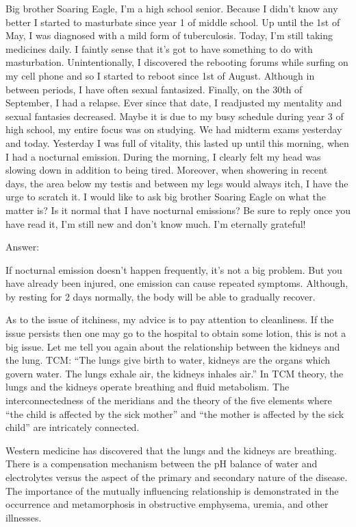 \documentclass[
]{book}
\begin{document}
Big brother Soaring Eagle, I'm a high school senior. Because I didn't know any better I started to masturbate since year 1 of middle school. Up until the 1st of May, I was diagnosed with a mild form of tuberculosis. Today, I'm still taking medicines daily. I faintly sense that it's got to have something to do with masturbation. Unintentionally, I discovered the rebooting forums while surfing on my cell phone and so I started to reboot since 1st of August. Although in between periods, I have often sexual fantasized. Finally, on the 30th of September, I had a relapse.
Ever since that date, I readjusted my mentality and sexual fantasies decreased. Maybe it is due to my busy schedule during year 3 of high school, my entire focus was on studying. We had midterm exams yesterday and today. Yesterday I was full of vitality, this lasted up until this morning, when I had a nocturnal emission. During the morning, I clearly felt my head was slowing down in addition to being tired. Moreover, when showering in recent days, the area below my testis and between my legs would always itch, I have the urge to scratch it. I would like to ask big brother Soaring Eagle on what the matter is? Is it normal that I have nocturnal emissions? Be sure to reply once you have read it, I'm still new and don't know much. I'm eternally grateful!

Answer:

If nocturnal emission doesn't happen frequently, it's not a big problem. But you have already been injured, one emission can cause repeated symptoms. Although, by resting for 2 days normally, the body will be able to gradually recover.

As to the issue of itchiness, my advice is to pay attention to cleanliness. If the issue persists then one may go to the hospital to obtain some lotion, this is not a big issue. Let me tell you again about the relationship between the kidneys and the lung. TCM: ``The lungs give birth to water, kidneys are the organs which govern water. The lungs exhale air, the kidneys inhales air.'' In TCM theory, the lungs and the kidneys operate breathing and fluid metabolism. The interconnectedness of the meridians and the theory of the five elements where ``the child is affected by the sick mother'' and ``the mother is affected by the sick child'' are intricately connected.

Western medicine has discovered that the lungs and the kidneys are breathing. There is a compensation mechanism between the pH balance of water and electrolytes versus the aspect of the primary and secondary nature of the disease. The importance of the mutually influencing relationship is demonstrated in the occurrence and metamorphosis in obstructive emphysema, uremia, and other illnesses.
\end{document}
